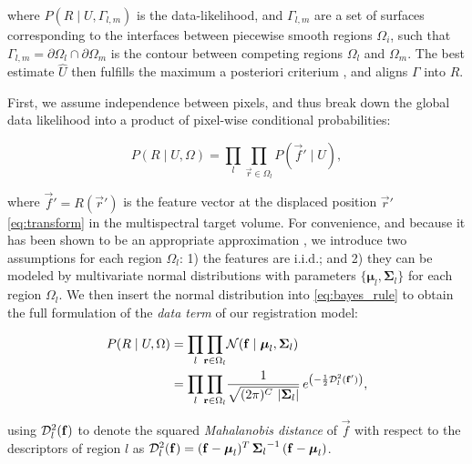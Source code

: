   where $P(R \mid U,\Gamma_{l,m})$ is the data-likelihood, and
  $\Gamma_{l,m}$ are a set of surfaces corresponding to the interfaces
  between piecewise smooth regions $\Omega_i$, such that
  $\Gamma_{l,m} = \partial \Omega_l \cap \partial \Omega_m$ is the
  contour between competing regions $\Omega_l$ and $\Omega_m$.
The best estimate $\hat{U}$ then fulfills the maximum a posteriori criterium
  \citep{bishop_pattern_2006}, and aligns $\Gamma$ into $R$.

First, we assume independence between pixels, and thus break down the
  global data likelihood into a product of pixel-wise conditional probabilities:

  \begin{equation}
  P(R \mid U,\Omega) = \underset{l}{\prod} \underset{\vec{r}\in \Omega_l}{\prod}
    P\left( \vec{f}' \mid U \right),
  \label{eq:bayes_aposteriori}
  \end{equation}

  where $\vec{f}' = R(\vec{r}')$ is the feature vector at the displaced
  position $\vec{r}'$ \eqref{eq:transform} in the multispectral target
  volume.
For convenience, and because it has been shown to be an appropriate approximation
  \citep{leemput_automated_1999,cuadra_comparison_2005}, we introduce two assumptions for each
  region $\Omega_l$:
  1) the features are i.i.d.; and 2) they can be modeled by multivariate normal
  distributions with parameters $\lbrace \boldsymbol{\mu}_l, \boldsymbol{\Sigma}_{l} \rbrace$
  for each region $\Omega_l$.
We then insert the normal distribution into \eqref{eq:bayes_rule} to obtain the full
  formulation of the \emph{data term} of our registration model:

 	\begin{align}
  P( R \mid U, \Omega ) &= \underset{l}{\prod} \underset{\vec{r} \in \Omega_l}{\prod}
  \mathcal{N} ( \vec{f} \mid \boldsymbol{\mu}_l, \boldsymbol{\Sigma}_{l} ) \notag\\
  &= \underset{l}{\prod} \underset{\vec{r} \in \Omega_l}{\prod} \frac{1}{ \sqrt{(2\pi)^{C}\,\left|\boldsymbol{\Sigma}_{l}\right|}}\,{e^{\left(-\frac{1}{2}
  \mdist{f'}{l} \right)}},
  \label{eq:pdf}
  \end{align}

  using $\mdist{f}{l}$ to denote the squared \emph{Mahalanobis distance} of $\vec{f}$ with respect
  to the descriptors of region $l$ as
  $\mdist{f}{l} = (\vec{f} - \boldsymbol{\mu}_l)^T \, {\boldsymbol{\Sigma}_l}^{-1} \, (\vec{f} - \boldsymbol{\mu}_l)$.



